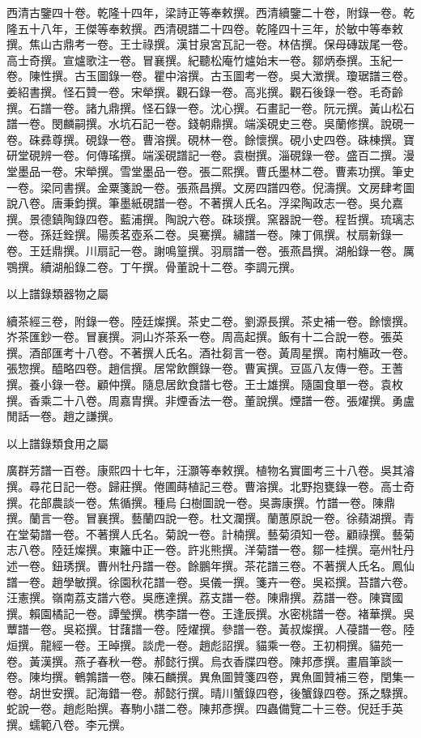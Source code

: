 \begin{pinyinscope}
西清古鑒四十卷。乾隆十四年，梁詩正等奉敕撰。西清續鑒二十卷，附錄一卷。乾隆五十八年，王傑等奉敕撰。西清硯譜二十四卷。乾隆四十三年，於敏中等奉敕撰。焦山古鼎考一卷。王士祿撰。漢甘泉宮瓦記一卷。林佶撰。保母磚跋尾一卷。高士奇撰。宣爐歌注一卷。冒襄撰。紀聽松庵竹爐始末一卷。鄒炳泰撰。玉紀一卷。陳性撰。古玉圖錄一卷。瞿中溶撰。古玉圖考一卷。吳大澂撰。瓊琚譜三卷。姜紹書撰。怪石贊一卷。宋犖撰。觀石錄一卷。高兆撰。觀石後錄一卷。毛奇齡撰。石譜一卷。諸九鼎撰。怪石錄一卷。沈心撰。石畫記一卷。阮元撰。黃山松石譜一卷。閔麟嗣撰。水坑石記一卷。錢朝鼎撰。端溪硯史三卷。吳蘭修撰。說硯一卷。硃彞尊撰。硯錄一卷。曹溶撰。硯林一卷。餘懷撰。硯小史四卷。硃棟撰。寶研堂硯辨一卷。何傳瑤撰。端溪硯譜記一卷。袁樹撰。淄硯錄一卷。盛百二撰。漫堂墨品一卷。宋犖撰。雪堂墨品一卷。張二熙撰。曹氏墨林二卷。曹素功撰。筆史一卷。梁同書撰。金粟箋說一卷。張燕昌撰。文房四譜四卷。倪濤撰。文房肆考圖說八卷。唐秉鈞撰。筆墨紙硯譜一卷。不著撰人氏名。浮梁陶政志一卷。吳允嘉撰。景德鎮陶錄四卷。藍浦撰。陶說六卷。硃琰撰。窯器說一卷。程哲撰。琉璃志一卷。孫廷銓撰。陽羨茗壺系二卷。吳騫撰。繡譜一卷。陳丁佩撰。杖扇新錄一卷。王廷鼎撰。川扇記一卷。謝鳴篁撰。羽扇譜一卷。張燕昌撰。湖船錄一卷。厲鶚撰。續湖船錄二卷。丁午撰。骨董說十二卷。李調元撰。

以上譜錄類器物之屬

續茶經三卷，附錄一卷。陸廷燦撰。茶史二卷。劉源長撰。茶史補一卷。餘懷撰。岕茶匯鈔一卷。冒襄撰。洞山岕茶系一卷。周高起撰。飯有十二合說一卷。張英撰。酒部匯考十八卷。不著撰人氏名。酒社芻言一卷。黃周星撰。南村觴政一卷。張惣撰。醯略四卷。趙信撰。居常飲饌錄一卷。曹寅撰。豆區八友傳一卷。王蓍撰。養小錄一卷。顧仲撰。隨息居飲食譜七卷。王士雄撰。隨園食單一卷。袁枚撰。香乘二十八卷。周嘉胄撰。非煙香法一卷。董說撰。煙譜一卷。張燿撰。勇盧閒話一卷。趙之謙撰。

以上譜錄類食用之屬

廣群芳譜一百卷。康熙四十七年，汪灝等奉敕撰。植物名實圖考三十八卷。吳其濬撰。尋花日記一卷。歸莊撰。倦圃蒔植記三卷。曹溶撰。北野抱甕錄一卷。高士奇撰。花部農談一卷。焦循撰。種烏臼樹圖說一卷。吳壽康撰。竹譜一卷。陳鼎撰。蘭言一卷。冒襄撰。藝蘭四說一卷。杜文瀾撰。蘭蕙原說一卷。徐蘋湖撰。青在堂菊譜一卷。不著撰人氏名。菊說一卷。計楠撰。藝菊須知一卷。顧祿撰。藝菊志八卷。陸廷燦撰。東籬中正一卷。許兆熊撰。洋菊譜一卷。鄒一桂撰。亳州牡丹述一卷。鈕琇撰。曹州牡丹譜一卷。餘鵬年撰。茶花譜三卷。不著撰人氏名。鳳仙譜一卷。趙學敏撰。徐園秋花譜一卷。吳儀一撰。箋卉一卷。吳崧撰。苔譜六卷。汪憲撰。嶺南荔支譜六卷。吳應達撰。荔支譜一卷。陳鼎撰。荔譜一卷。陳寶國撰。賴園橘記一卷。譚瑩撰。槜李譜一卷。王逢辰撰。水密桃譜一卷。褚華撰。吳蕈譜一卷。吳崧撰。甘藷譜一卷。陸燿撰。參譜一卷。黃叔燦撰。人葠譜一卷。陸烜撰。龍經一卷。王晫撰。談虎一卷。趙彪詔撰。貓乘一卷。王初桐撰。貓苑一卷。黃漢撰。燕子春秋一卷。郝懿行撰。烏衣香牒四卷。陳邦彥撰。畫眉筆談一卷。陳均撰。鵪鶉譜一卷。陳石麟撰。異魚圖贊箋四卷，異魚圖贊補三卷，閏集一卷。胡世安撰。記海錯一卷。郝懿行撰。晴川蟹錄四卷，後蟹錄四卷。孫之騄撰。蛇說一卷。趙彪貽撰。春駒小譜二卷。陳邦彥撰。四蟲備覽二十三卷。倪廷手英撰。蠕範八卷。李元撰。


\end{pinyinscope}
